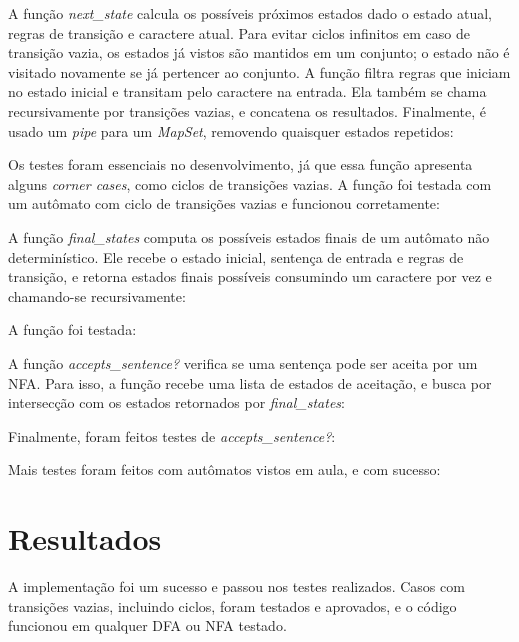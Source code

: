 \documentclass[conference]{IEEEtran}
\begin{document}
A função \emph{next\_state} calcula os possíveis próximos estados dado o estado atual, regras de transição e caractere atual. Para evitar ciclos infinitos em caso de transição vazia, os estados já vistos são mantidos em um conjunto; o estado não é visitado novamente se já pertencer ao conjunto. A função filtra regras que iniciam no estado inicial e transitam pelo caractere na entrada. Ela também se chama recursivamente por transições vazias, e concatena os resultados. Finalmente, é usado um \emph{pipe} para um \emph{MapSet}, removendo quaisquer estados repetidos:



Os testes foram essenciais no desenvolvimento, já que essa função apresenta alguns \emph{corner cases}, como ciclos de transições vazias. A função foi testada com um autômato com ciclo de transições vazias e funcionou corretamente:



A função \emph{final\_states} computa os possíveis estados finais de um autômato não determinístico. Ele recebe o estado inicial, sentença de entrada e regras de transição, e retorna estados finais possíveis consumindo um caractere por vez e chamando-se recursivamente:



A função foi testada:



A função \emph{accepts\_sentence?} verifica se uma sentença pode ser aceita por um NFA. Para isso, a função recebe uma lista de estados de aceitação, e busca por intersecção com os estados retornados por \emph{final\_states}:



Finalmente, foram feitos testes de \emph{accepts\_sentence?}:



Mais testes foram feitos com autômatos vistos em aula, e com sucesso:



\section{Resultados}

A implementação foi um sucesso e passou nos testes realizados. Casos com transições vazias, incluindo ciclos, foram testados e aprovados, e o código funcionou em qualquer DFA ou NFA testado.
\end{document}
